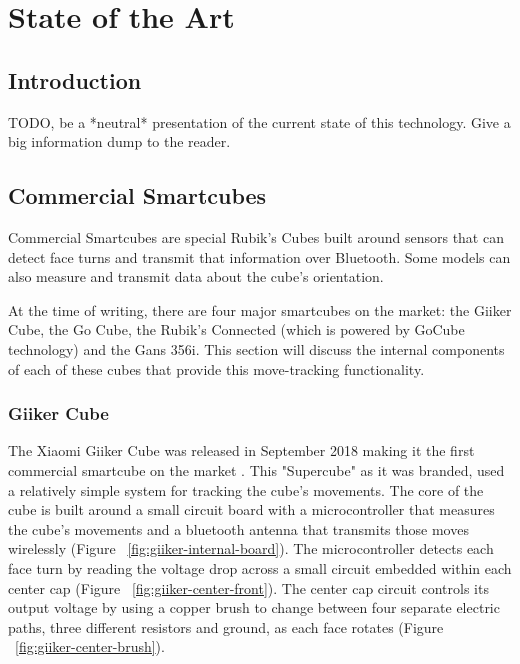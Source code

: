 
\chapter{State of the Art} %

\label{Chapter3} %


\section{Introduction}

TODO, be a *neutral* presentation of the current state of this technology. Give a big information dump to the reader.


\section{Commercial Smartcubes}

Commercial Smartcubes are special Rubik's Cubes built around sensors that can detect face turns and transmit that information over Bluetooth.
Some models can also measure and transmit data about the cube's orientation.

At the time of writing, there are four major smartcubes on the market: the Giiker Cube, the Go Cube, the Rubik's Connected (which is powered by GoCube technology) and the Gans 356i.
This section will discuss the internal components of each of these cubes that provide this move-tracking functionality.

\subsection{Giiker Cube}
The Xiaomi Giiker Cube was released in September 2018 making it the first commercial smartcube on the market \cite{giiker-thecubicle}.
This "Supercube" as it was branded, used a relatively simple system for tracking the cube's movements.
The core of the cube is built around a small circuit board with a microcontroller that measures the cube's movements and a bluetooth antenna that transmits those moves wirelessly (Figure ~\ref{fig:giiker-internal-board}).
The microcontroller detects each face turn by reading the voltage drop across a small circuit embedded within each center cap (Figure ~\ref{fig:giiker-center-front}).
The center cap circuit controls its output voltage by using a copper brush to change between four separate electric paths, three different resistors and ground, as each face rotates (Figure ~\ref{fig:giiker-center-brush}). \cite{giiker-internals}


